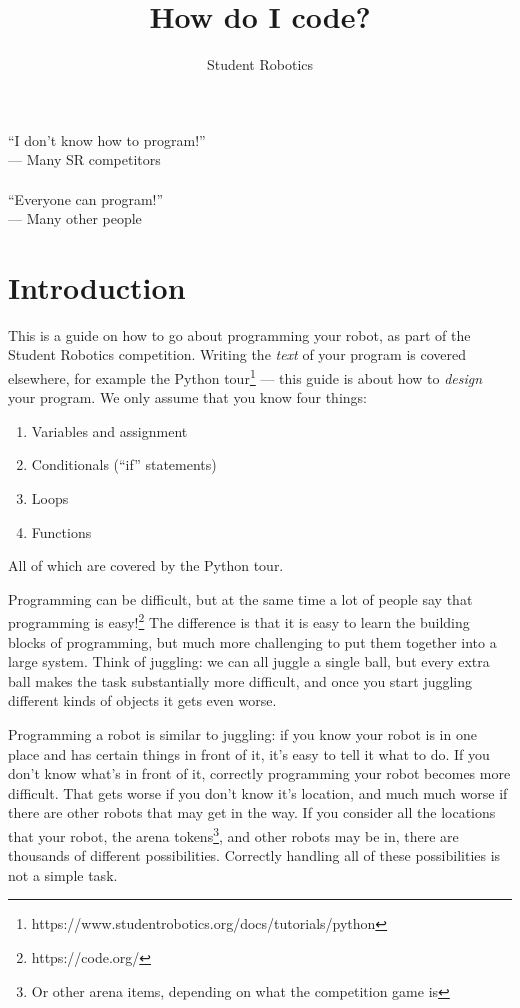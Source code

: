 \documentclass[a4paper,10pt]{article}
\title{How do I code?}
\author{Student Robotics}
\begin{document}
\maketitle

\hfill ``I don't know how to program!''\\
\hphantom{fgasdf}\hfill --- Many SR competitors\\
\\
``Everyone can program!''\\
--- Many other people\\

\section{Introduction}

This is a guide on how to go about programming your robot, as part of the
Student Robotics competition. Writing the \textit{text} of your program is
covered elsewhere, for example the Python
tour\footnote{https://www.studentrobotics.org/docs/tutorials/python} --- this
guide is about how to \textit{design} your program. We only assume that you
know four things:
\begin{enumerate}
	\item Variables and assignment
	\item Conditionals (``if'' statements)
	\item Loops
	\item Functions
\end{enumerate}
All of which are covered by the Python tour.

Programming can be difficult, but at the same time a lot of people say that
programming is easy!\footnote{https://code.org/} The difference is that it is
easy to learn the building blocks of programming, but much more challenging to
put them together into a large system. Think of juggling: we can all juggle
a single ball, but every extra ball makes the task substantially more
difficult, and once you start juggling different kinds of objects it gets
even worse.

Programming a robot is similar to juggling: if you know your robot is in one
place and has certain things in front of it, it's easy to tell it what to do.
If you don't know what's in front of it, correctly programming your robot
becomes more difficult. That gets worse if you don't know it's location, and
much much worse if there are other robots that may get in the way. If you
consider all the locations that your robot, the arena tokens\footnote{Or other
arena items, depending on what the competition game is}, and other robots
may be in, there are thousands of different possibilities. Correctly handling
all of these possibilities is not a simple task.
\end{document}
